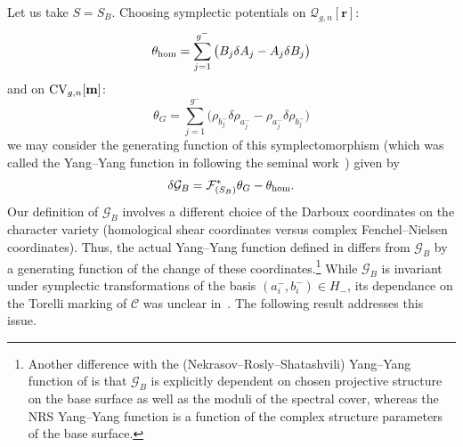 \documentclass[pdftex]{sigma}
\numberwithin{equation}{section}
\theoremstyle{definition}
\begin{document}
Let us take $S=S_B$. Choosing symplectic potentials on $\mathcal{Q}_{g,n}[\mathbf{r}]$:
\begin{equation*}%
\theta_{{\rm hom}}=\sum^{g^-}_{j=1} \big(B_j \delta A_j - A_j \delta B_j \big)\end{equation*}
and on ${\rm CV}_{g,n}[\mathbf{m}]$:
\begin{equation*}%
\theta_{G}=\sum^{g^-}_{j=1}\big( \rho_{b^-_j} \delta \rho_{a^-_j} - \rho_{a^-_j} \delta \rho_{b^-_j} \big)
\end{equation*}
we may consider the generating function of this symplectomorphism (which was called the Yang--Yang function in \cite{bertola2021wkb} following the seminal work~\cite{nekrasov}) given by
 \begin{equation*}%
 \delta \mathcal{G}_B=\mathcal{F}_{(S_B)}^*\theta_{G}-\theta_{{\rm hom}}.
 \end{equation*}
 Our definition of $\mathcal{G}_B$ involves a different choice of the Darboux coordinates on the character variety (homological shear coordinates versus complex Fenchel--Nielsen coordinates). Thus, the actual Yang--Yang function defined in \cite{nekrasov} differs from $\mathcal{G}_B$ by a generating function of the change of these coordinates.\footnote{Another difference with the (Nekrasov--Rosly--Shatashvili) Yang--Yang function of \cite{nekrasov} is that $\mathcal{G}_B$ is explicitly
dependent on chosen projective structure on the base surface as well as the moduli of the spectral cover,
whereas the NRS Yang--Yang function is a function of the complex structure parameters of the base surface.}
While $\mathcal{G}_B$ is invariant under symplectic transformations of the basis $(a^-_i,b^-_i) \in H_{-} $, its dependance on the Torelli marking of $\mathcal{C}$ was unclear in~\cite{bertola2021wkb}. The following result addresses this issue.
\end{document}
